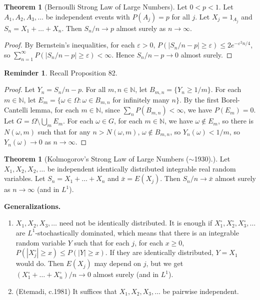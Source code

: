 \documentclass{article}
\newcommand{\N}{\mathbb{N}}
\theoremstyle{definition}
\newtheorem{theorem}{Theorem}
\newtheorem*{reminder}{Reminder}
\newtheorem*{theorem*}{Theorem}
\begin{document}
\begin{theorem}[Bernoulli Strong Law of Large Numbers]
Let $0 < p < 1$. Let $A_1, A_2, A_3, \dots$ be independent events with $P(A_j) = p$ for all $j$. Let $X_j = 1_{A_j}$ and $S_n = X_1 + \dots + X_n$. Then $S_n/n \to p$ almost surely as $n \to \infty$.
\end{theorem}
\begin{proof}
    By Bernstein's inequalities, for each $\varepsilon > 0$, $P(|S_n/n-p| \geq \varepsilon) \leq 2e^{-\varepsilon^2 n/4}$, so $\sum_{n=1}^\infty P(|S_n/n - p| \geq \varepsilon) < \infty$. Hence $S_n/n - p \to 0$ almost surely.
\end{proof}
\begin{reminder}
Recall Proposition 82.
\end{reminder}
\begin{proof}
Let $Y_n = S_n/n - p$. For all $m, n \in \N$, let $B_{m,n} = \{Y_n \geq 1/m\}$. For each $m \in \N$, let $E_m = \{\omega \in \Omega : \omega \in B_{m,n}$ for infinitely many $n\}$. By the first Borel-Cantelli lemma, for each $m \in \N$, since $\sum_n P(B_{m,n}) < \infty$, we have $P(E_m) = 0$. Let $G = \Omega \setminus \bigcup_m E_m$. For each $\omega \in G$, for each $m \in \N$, we have $\omega \notin E_m$, so there is $N(\omega, m)$ such that for any $n > N(\omega, m)$, %
    $\omega \notin B_{m,n}$, so $Y_n(\omega) < 1/m$, so $Y_n(\omega) \to 0$ as $n \to \infty$.
\end{proof}

\begin{theorem*}[Kolmogorov's Strong Law of Large Numbers ($\sim$1930).]
Let $X_1, X_2, X_2, \dots$ be independent identically distributed integrable real random variables. Let $S_n = X_1 + \dots + X_n$ and $\bar{x} = E(X_j)$. Then $S_n/n \to \bar{x}$ almost surely as $n \to \infty$ (and in $L^1$).
\end{theorem*}

\textbf{Generalizations.}
\begin{enumerate}
    \item $X_1, X_2, X_3, \dots$ need not be identically distributed. It is enough if $X_1^\circ, X_2^\circ, X_3^\circ, \dots$ are $L^1$-stochastically dominated, which means that there is an integrable random variable $Y$ such that for each $j$, for each $x \geq 0$, $P(|X_j^\circ| \geq x) \leq P(|Y| \geq x)$. If they are identically distributed, $Y = X_1$ would do. Then $E(X_j)$ may depend on $j$, but we get $(X_1^\circ + \dots + X_n^\circ)/n \to 0$ almost surely (and in $L^1$).
    \item (Etemadi, c.1981) It suffices that $X_1, X_2, X_3, \dots$ be pairwise independent.
\end{enumerate}
\end{document}
